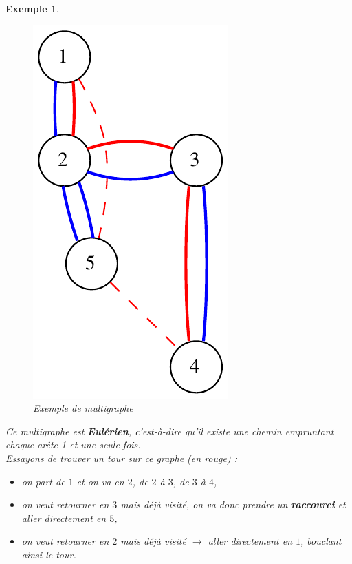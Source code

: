 \documentclass{article}
\newtheorem{exemple}{Exemple}[section]
\begin{document}
\begin{sffamily}
\begin{exemple}$ $\\
\begin{figure}[h!]
    \begin{center}
    \includegraphics[scale=0.45]{multig.pdf}
    \caption{Exemple de multigraphe}
    \end{center}	
\end{figure}  

\noindent Ce multigraphe est \textbf{Eulérien}, c'est-à-dire qu'il existe une chemin empruntant chaque arête 1 et une seule fois.\\
Essayons de trouver un tour sur ce graphe (en rouge) :
\begin{itemize}
\item on part de $1$ et on va en $2$, de $2$ à $3$, de $3$ à $4$,
\item on veut retourner en $3$ mais déjà visité, on va donc prendre un \textbf{raccourci} et aller directement en $5$,
\item on veut retourner en $2$ mais déjà visité $\rightarrow$ aller directement en $1$, bouclant ainsi le tour.
\end{itemize}
\end{exemple}


\end{sffamily}
\end{document}
